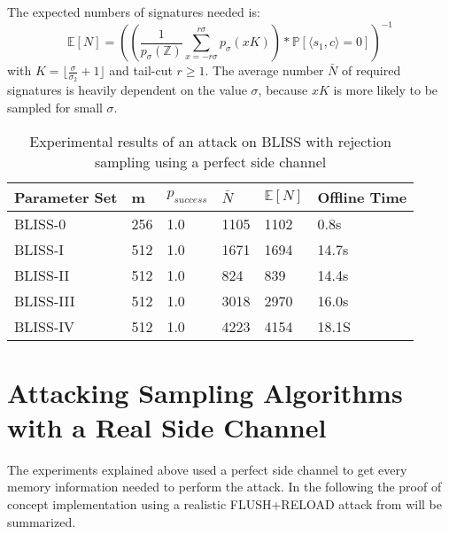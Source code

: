 The expected numbers of signatures needed is:
\begin{equation*}
	\mathbb{E}[N] = ((\frac{1}{p_\sigma(\mathbb{Z})}\sum_{x=-r\sigma}^{r\sigma}p_\sigma(xK))*\mathbb{P}[\langle s_1,c \rangle = 0])^{-1}	
\end{equation*}
with $K= \lfloor \frac{\sigma}{\sigma_2}+1\rfloor$ and tail-cut $r\ge 1$. The average number $\bar{N}$ of required signatures is heavily dependent on the value $\sigma$, because $xK$ is more likely to be sampled for small $\sigma$. 
\begin{table}[h!]
	\centering
	
\begin{tabular}{|l|l|l|l|l|l|} 	
	Parameter Set & m & $p_{success}$&$\bar{N}$&$\mathbb{E}[N]$&Offline Time\\\hline
	BLISS-0 & 256 & 1.0 &1105 & 1102 &0.8s\\
	BLISS-I&512&1.0&1671 & 1694 & 14.7s \\
	BLISS-II&512 & 1.0 & 824&839 & 14.4s\\
	BLISS-III&512 & 1.0 & 3018 & 2970 & 16.0s\\
	BLISS-IV&512 & 1.0 & 4223 & 4154 & 18.1S\\
\end{tabular}
\caption{Experimental results of an attack on BLISS with rejection sampling using a perfect side channel}
\label{tab:rejectionperfect}
\end{table}
\newpage
\section{Attacking Sampling Algorithms with a Real Side Channel}
The experiments explained above used a perfect side channel to get every memory information needed to perform the attack. In the following the proof of concept implementation using a realistic FLUSH+RELOAD attack from \cite{cryptoeprint:2016:300} will be summarized.

